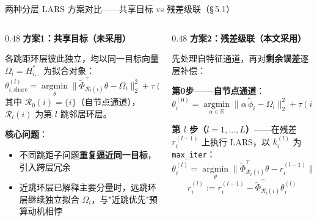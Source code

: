 \documentclass[aspectratio=169,9pt,xcolor=dvipsnames]{beamer}
\newcommand{\highlight}[1]{\textcolor{myred}{\textbf{#1}}}
\newcommand{\green}[1]{\textcolor{mygreen}{#1}}
\begin{document}
\begin{frame}{两种分层 LARS 方案对比——共享目标 vs 残差级联（§\,5.1）}
\begin{columns}[T]

\begin{column}{0.48\textwidth}
  \textbf{\highlight{方案1：共享目标（未采用）}}

  各跳距环层彼此独立，均以同一目标向量 $\Omega_i=H_{i,:}^*$ 为拟合对象：
  \begin{equation*}
    \theta_{i,\mathrm{share}}^{(l)}
    =\operatorname*{argmin}_{\theta}
    \bigl\|\tilde{\Phi}_{\mathcal{R}_l(i)}^{\top}\theta-\Omega_i\bigr\|_2^2
    +\tau(i)\|\theta\|_1,
     l=0,1,\ldots,L
  \end{equation*}
  其中 $\mathcal{R}_0(i)=\{i\}$（自节点通道），$\mathcal{R}_l(i)$ 为第 $l$ 跳邻居环层。

  \smallskip
  \textbf{核心问题}：
  \begin{itemize}\small\setlength{\itemsep}{1pt}
    \item 不同跳距子问题\textbf{重复逼近同一目标}，引入跨层冗余
    \item 近跳环层已解释主要分量时，远跳环层继续独立拟合 $\Omega_i$，与"近跳优先"预算动机相悖
  \end{itemize}
\end{column}

\begin{column}{0.48\textwidth}
  \textbf{\green{方案2：残差级联（本文采用）}}

  先处理自特征通道，再对\textbf{剩余误差}逐层补偿：

  \textbf{第0步——自节点通道}：
  \begin{equation*}
    \theta_i^{(0)}=\operatorname*{argmin}_{\alpha\in\mathbb{R}}
    \bigl\|\alpha\,\tilde{\phi}_i-\Omega_i\bigr\|_2^2+\tau(i)|\alpha|,
    \quad
    r_i^{(0)}:=\Omega_i-\theta_i^{(0)}\tilde{\phi}_i
  \end{equation*}

  \textbf{第 $l$ 步（$l=1,\ldots,L$）}——在残差 $r_i^{(l-1)}$ 上执行 LARS，以 $k_i^{(l)}$ 为 \texttt{max\_iter}：
  \begin{equation*}
    \theta_i^{(l)}=\operatorname*{argmin}_{\theta}
    \bigl\|\tilde{\Phi}_{\mathcal{R}_l(i)}^{\top}\theta-r_i^{(l-1)}\bigr\|_2^2
    +\tau(i)\|\theta\|_1
  \end{equation*}
  \begin{equation*}
    r_i^{(l)}:=r_i^{(l-1)}-\tilde{\Phi}_{\mathcal{R}_l(i)}^{\top}\theta_i^{(l)}
  \end{equation*}
\end{column}


\end{columns}
\end{frame}
\end{document}

